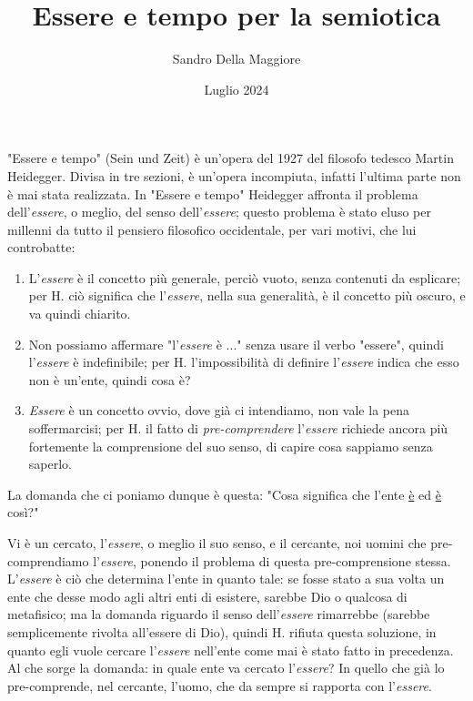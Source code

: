 \documentclass[a4paper,12pt,oneside]{article}%
\begin{document}
	\author{Sandro Della Maggiore}
	\title{Essere e tempo per la semiotica}
	\date{Luglio 2024}
	
	\maketitle


"Essere e tempo" (Sein und Zeit) è un’opera del 1927 del filosofo tedesco Martin Heidegger. Divisa in tre sezioni, è un’opera incompiuta, infatti l’ultima parte non è mai stata realizzata. In "Essere e tempo" Heidegger affronta il problema dell’\textit{essere}, o meglio, del senso dell'\textit{essere}; questo problema è stato eluso per millenni da tutto il pensiero filosofico occidentale, per vari motivi, che lui controbatte:

\begin{enumerate}
	\item L'\textit{essere} è il concetto più generale, perciò vuoto, senza contenuti da esplicare; per H. ciò significa che l'\textit{essere}, nella sua generalità, è il concetto più oscuro, e va quindi chiarito.
	\item Non possiamo affermare "l'\textit{essere} è ..." senza usare il verbo "essere", quindi l'\textit{essere} è indefinibile; per H. l'impossibilità di definire l'\textit{essere} indica che esso non è un'ente, quindi cosa è?
	\item \textit{Essere} è un concetto ovvio, dove già ci intendiamo, non vale la pena soffermarcisi; per H. il fatto di \textit{pre-comprendere} l'\textit{essere} richiede ancora più fortemente la comprensione del suo senso, di capire cosa sappiamo senza saperlo.
\end{enumerate}

La domanda che ci poniamo dunque è questa: "Cosa significa che l'ente \underline{è} ed \underline{è} così?"

Vi è un cercato, l'\textit{essere}, o meglio il suo senso, e il cercante, noi uomini che pre-comprendiamo l'\textit{essere}, ponendo il problema di questa pre-comprensione stessa. L'\textit{essere} è ciò che determina l'ente in quanto tale: se fosse stato a sua volta un ente che desse modo agli altri enti di esistere, sarebbe Dio o qualcosa di metafisico; ma la domanda riguardo il senso dell'\textit{essere} rimarrebbe (sarebbe semplicemente rivolta all'essere di Dio), quindi H. rifiuta questa soluzione, in quanto egli vuole cercare l'\textit{essere} nell'ente come mai è stato fatto in precedenza. Al che sorge la domanda: in quale ente va cercato l'\textit{essere}? In quello che già lo pre-comprende, nel cercante, l'uomo, che da sempre si rapporta con l'\textit{essere}.
\end{document}
